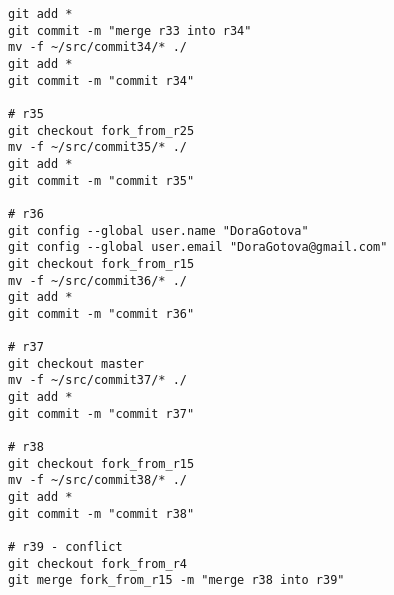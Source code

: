 
\tiny
\begin{verbatim}
git add *
git commit -m "merge r33 into r34"
mv -f ~/src/commit34/* ./
git add *
git commit -m "commit r34"

# r35
git checkout fork_from_r25
mv -f ~/src/commit35/* ./
git add *
git commit -m "commit r35"

# r36
git config --global user.name "DoraGotova"
git config --global user.email "DoraGotova@gmail.com"
git checkout fork_from_r15
mv -f ~/src/commit36/* ./
git add *
git commit -m "commit r36"

# r37
git checkout master
mv -f ~/src/commit37/* ./
git add *
git commit -m "commit r37"

# r38
git checkout fork_from_r15
mv -f ~/src/commit38/* ./
git add *
git commit -m "commit r38"

# r39 - conflict
git checkout fork_from_r4
git merge fork_from_r15 -m "merge r38 into r39"


\end{verbatim}
\normalsize